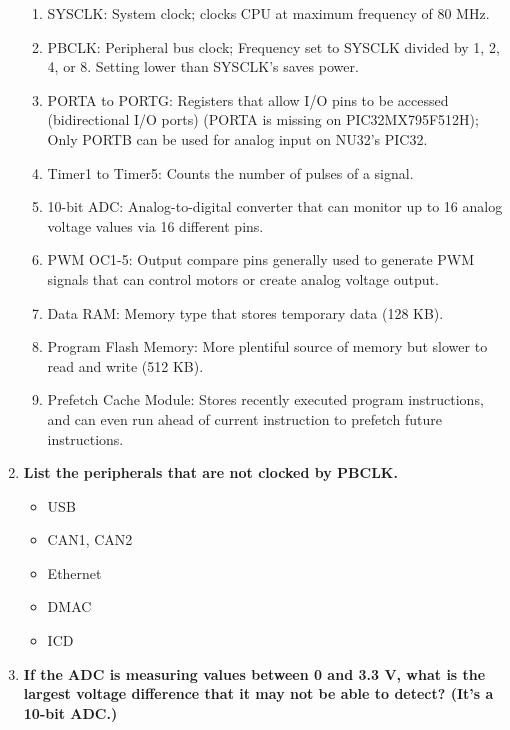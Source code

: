 \documentclass{article}
\begin{document}
\begin{enumerate}[label=\textbf{\arabic*})]
    \begin{enumerate}[label=\textbf{\alph*}.]
        \item SYSCLK: System clock; clocks CPU at maximum frequency of 80 MHz.
        \item PBCLK: Peripheral bus clock; Frequency set to SYSCLK divided by 1, 2, 4, or 8. Setting lower than SYSCLK's saves power.
        \item PORTA to PORTG: Registers that allow I/O pins to be accessed (bidirectional I/O ports) 
        (PORTA is missing on PIC32MX795F512H); Only PORTB can be used for analog input on NU32's PIC32.
        \item Timer1 to Timer5: Counts the number of pulses of a signal.
        \item 10-bit ADC: Analog-to-digital converter that can monitor up to 16 analog voltage values via 16 different pins.
        \item PWM OC1-5: Output compare pins generally used to generate PWM signals that can control motors or 
        create analog voltage output.
        \item Data RAM: Memory type that stores temporary data (128 KB).
        \item Program Flash Memory: More plentiful source of memory but slower to read and write (512 KB).
        \item Prefetch Cache Module: Stores recently executed program instructions, and can even run ahead 
        of current instruction to prefetch future instructions. 
    \end{enumerate}

    \item \textbf{List the peripherals that are not clocked by PBCLK.} \\
    
    \begin{itemize}
        \item USB
        \item CAN1, CAN2
        \item Ethernet
        \item DMAC
        \item ICD
    \end{itemize}

    \item \textbf{If the ADC is measuring values between 0 and 3.3 V, what is the largest voltage
    difference that it may not be able to detect? (It’s a 10-bit ADC.)} \\


\end{enumerate}
\end{document}
